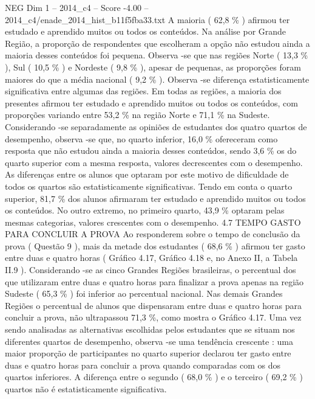 \begin{textsample}{NEG Dim 1 – 2014\_c4 – Score -4.00 – 2014\_c4/enade\_2014\_hist\_b11f5fba33.txt}
A maioria ( 62,8 \% ) afirmou ter estudado e aprendido muitos ou todos os conteúdos.
Na análise por Grande Região, a proporção de respondentes que escolheram a opção não estudou ainda a maioria desses conteúdos foi pequena.
Observa -se que nas regiões Norte ( 13,3 \% ), Sul ( 10,5 \% ) e Nordeste ( 9,8 \% ), apesar de pequenas, as proporções foram maiores do que a média nacional ( 9,2 \% ).
Observa -se diferença estatisticamente significativa entre algumas das regiões.
Em todas as regiões, a maioria dos presentes afirmou ter estudado e aprendido muitos ou todos os conteúdos, com proporções variando entre 53,2 \% na região Norte e 71,1 \% na Sudeste.
Considerando -se separadamente as opiniões de estudantes dos quatro quartos de desempenho, observa -se que, no quarto inferior, 16,0 \% ofereceram como resposta que não estudou ainda a maioria desses conteúdos, sendo 3,6 \% os do quarto superior com a mesma resposta, valores decrescentes com o desempenho.
As diferenças entre os alunos que optaram por este motivo de dificuldade de todos os quartos são estatisticamente significativas.
Tendo em conta o quarto superior, 81,7 \% dos alunos afirmaram ter estudado e aprendido muitos ou todos os conteúdos.
No outro extremo, no primeiro quarto, 43,9 \% optaram pelas mesmas categorias, valores crescentes com o desempenho. 4.7 TEMPO GASTO PARA CONCLUIR A PROVA Ao responderem sobre o tempo de conclusão da prova ( Questão 9 ), mais da metade dos estudantes ( 68,6 \% ) afirmou ter gasto entre duas e quatro horas ( Gráfico 4.17, Gráfico 4.18 e, no Anexo II, a Tabela II.9 ).
Considerando -se as cinco Grandes Regiões brasileiras, o percentual dos que utilizaram entre duas e quatro horas para finalizar a prova apenas na região Sudeste ( 65,3 \% ) foi inferior ao percentual nacional.
Nas demais Grandes Regiões o percentual de alunos que dispensaram entre duas e quatro horas para concluir a prova, não ultrapassou 71,3 \%, como mostra o Gráfico 4.17.
Uma vez sendo analisadas as alternativas escolhidas pelos estudantes que se situam nos diferentes quartos de desempenho, observa -se uma tendência crescente : uma maior proporção de participantes no quarto superior declarou ter gasto entre duas e quatro horas para concluir a prova quando comparadas com os dos quartos inferiores.
A diferença entre o segundo ( 68,0 \% ) e o terceiro ( 69,2 \% ) quartos não é estatisticamente significativa.

\end{textsample}
